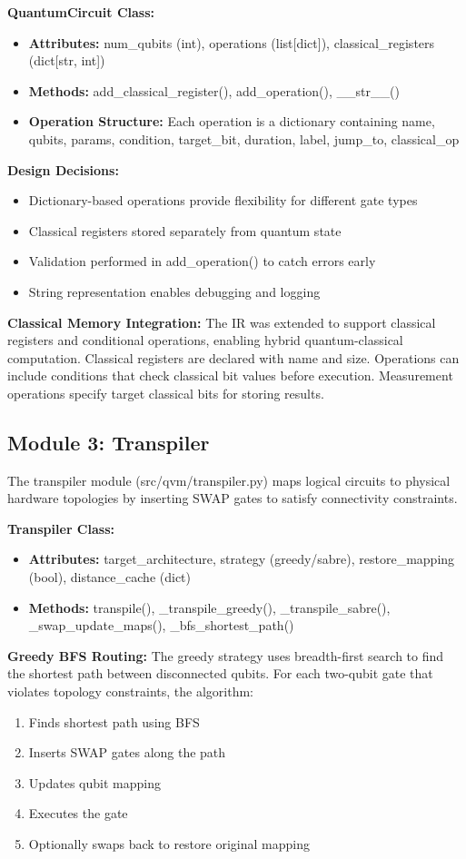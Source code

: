 \textbf{QuantumCircuit Class:}
\begin{itemize}
\item \textbf{Attributes:} num\_qubits (int), operations (list[dict]), classical\_registers (dict[str, int])
\item \textbf{Methods:} add\_classical\_register(), add\_operation(), \_\_str\_\_()
\item \textbf{Operation Structure:} Each operation is a dictionary containing name, qubits, params, condition, target\_bit, duration, label, jump\_to, classical\_op
\end{itemize}

\textbf{Design Decisions:}
\begin{itemize}
\item Dictionary-based operations provide flexibility for different gate types
\item Classical registers stored separately from quantum state
\item Validation performed in add\_operation() to catch errors early
\item String representation enables debugging and logging
\end{itemize}

\textbf{Classical Memory Integration:}
The IR was extended to support classical registers and conditional operations, enabling hybrid quantum-classical computation. Classical registers are declared with name and size. Operations can include conditions that check classical bit values before execution. Measurement operations specify target classical bits for storing results.

\subsection{Module 3: Transpiler}
The transpiler module (src/qvm/transpiler.py) maps logical circuits to physical hardware topologies by inserting SWAP gates to satisfy connectivity constraints.

\textbf{Transpiler Class:}
\begin{itemize}
\item \textbf{Attributes:} target\_architecture, strategy (greedy/sabre), restore\_mapping (bool), distance\_cache (dict)
\item \textbf{Methods:} transpile(), \_transpile\_greedy(), \_transpile\_sabre(), \_swap\_update\_maps(), \_bfs\_shortest\_path()
\end{itemize}

\textbf{Greedy BFS Routing:}
The greedy strategy uses breadth-first search to find the shortest path between disconnected qubits. For each two-qubit gate that violates topology constraints, the algorithm:
\begin{enumerate}
\item Finds shortest path using BFS
\item Inserts SWAP gates along the path
\item Updates qubit mapping
\item Executes the gate
\item Optionally swaps back to restore original mapping
\end{enumerate}

